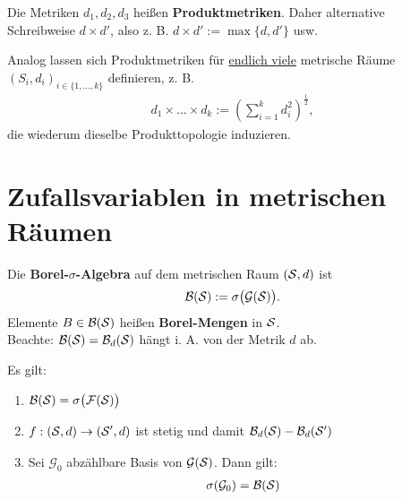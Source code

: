 \begin{defi}
	Die Metriken $d_1,d_2,d_3$ heißen \textbf{Produktmetriken}.
	Daher alternative\\ Schreibweise $d\times d'$, also z. B. $d\times d':=\max\lbrace d,d'\rbrace$ usw.
\end{defi}

\begin{bemerkungnr} %
	Analog lassen sich Produktmetriken für \underline{endlich viele} metrische Räume $(S_i,d_i)_{i\in\lbrace1,\ldots,k\rbrace}$ definieren, z. B.
	\begin{align*}
		d_1\times\ldots\times d_k:=\left(\sum\limits_{i=1}^k d_i^2\right)^{\frac{1}{2}},
	\end{align*}
	die wiederum dieselbe Produkttopologie induzieren.
\end{bemerkungnr}

\section{Zufallsvariablen in metrischen Räumen}
\begin{definition} %
	Die \textbf{Borel-$\sigma$-Algebra} auf dem metrischen Raum $(\S,d)$ ist %
	\begin{align*}
		\B(\S):=\sigma\big(\mathcal{G}(\S)\big).
	\end{align*}
	Elemente $B\in\B(\S)$ heißen \textbf{Borel-Mengen} in $\S$.\\
	Beachte: $\B(\S)=\B_d(\S)$ hängt i. A. von der Metrik $d$ ab.
\end{definition}

\begin{lemma}\label{Lemma3.2} %
	Es gilt:
	\begin{enumerate}[label=(\arabic*)]
		\item 
		$\begin{aligned}
			\B(\S)=\sigma\big(\mathcal{F}(\S)\big)
		\end{aligned}$
		\item $\begin{aligned}
			f:(\S,d)\to(\S',d)
		\end{aligned}$ ist stetig und damit $\B_d(\S)-\B_d(\S')$ %
		\item Sei $\mathcal{G}_0$ abzählbare Basis von $\mathcal{G}(\S)$. Dann gilt:
		\begin{align*}
			\sigma(\mathcal{G}_0)=\B(\S)
		\end{align*}
	\end{enumerate}
\end{lemma}

